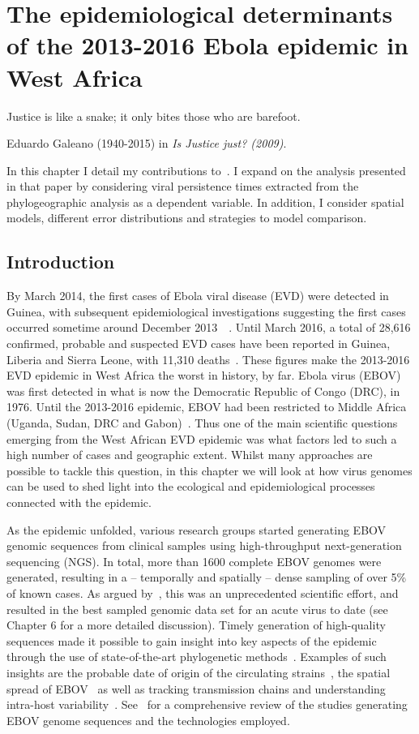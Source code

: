 \chapter{The epidemiological determinants of the 2013-2016 Ebola
epidemic in West Africa}
\epigraph{Justice is like a snake; it only bites those who are barefoot.}{Eduardo Galeano (1940-2015) in \textit{Is Justice just? (2009)}.}


In this chapter I detail my contributions to~\cite{Dudas2017}.
I expand on the analysis presented in that paper by considering viral persistence times extracted from the phylogeographic analysis as a dependent variable.
In addition, I consider spatial models, different error distributions and strategies to model comparison.

\section{Introduction}

By March 2014, the first cases of Ebola viral disease (EVD) were detected in Guinea, with subsequent epidemiological investigations suggesting the first cases occurred sometime around December 2013~~\citep{Baize2014}.
Until March 2016, a total of 28,616 confirmed, probable and suspected EVD cases have been reported in Guinea, Liberia and Sierra Leone, with 11,310 deaths~\citep{WHO2016}.
These figures make the 2013-2016 EVD epidemic in West Africa the worst in history, by far.
Ebola virus (EBOV) was first detected in what is now the Democratic Republic of Congo (DRC), in 1976.
Until the 2013-2016 epidemic, EBOV had been restricted to  Middle Africa (Uganda, Sudan, DRC and Gabon)~\citep{CDC2015}.
Thus one of the main scientific questions emerging from the West African EVD epidemic was what factors led to such a high number of cases and geographic extent.
Whilst many approaches are possible to tackle this question, in this chapter we will look at how virus genomes can be used to shed light into the ecological and epidemiological processes connected with the epidemic.

As the epidemic unfolded, various research groups started generating EBOV genomic sequences from clinical samples using high-throughput next-generation sequencing (NGS).
In total, more than 1600 complete EBOV genomes were generated, resulting in a -- temporally and spatially --  dense sampling of over 5\% of known cases.
As argued by~\cite{Holmes2016}, this was an unprecedented scientific effort, and resulted in the best sampled genomic data set for an acute virus to date (see Chapter 6 for a more detailed discussion).
Timely generation of high-quality sequences made it possible to gain insight into key aspects of the epidemic through the use of state-of-the-art phylogenetic methods~\citep{Dudas2014,Gire2014,Carroll2015,Park2015}.
Examples of such insights are the probable date of origin of the circulating strains~\citep{Gire2014, Park2015}, the spatial spread of EBOV~\citep{Carroll2015,Dudas2017} as well as tracking transmission chains and understanding intra-host variability~\citep{Park2015}.
See~\cite{Holmes2016} for a comprehensive review of the studies generating EBOV genome sequences and the technologies employed.

